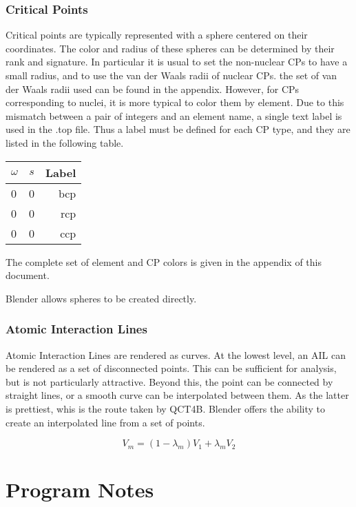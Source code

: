 \documentclass{report}
\begin{document}
\subsection{Critical Points}
Critical points are typically represented with a sphere centered on their coordinates.
The color and radius of these spheres can be determined by their rank and signature.
In particular it is usual to set the non-nuclear CPs to have a small radius, and to use the van der Waals radii of nuclear CPs.
the set of van der Waals radii used can be found in the appendix.
However, for CPs corresponding to nuclei, it is more typical to color them by element.
Due to this mismatch between a pair of integers and an element name, a single text label is used in the .top file.
Thus a label must be defined for each CP type, and they are listed in the following table.

\begin{tabular}{ l c || r }
$\omega$ & $s$ & Label \\
\hline
0 & 0 & bcp \\
0 & 0 & rcp \\
0 & 0 & ccp \\
\end{tabular}

The complete set of element and CP colors is given in the appendix of this document.

Blender allows spheres to be created directly.

\subsection{Atomic Interaction Lines}

Atomic Interaction Lines are rendered as curves.
At the lowest level, an AIL can be rendered as a set of disconnected points.
This can be sufficient for analysis, but is not particularly attractive.
Beyond this, the point can be connected by straight lines, or a smooth curve can be interpolated between them.
As the latter is prettiest, whis is the route taken by QCT4B.
Blender offers the ability to create an interpolated line from a set of points.

\begin{equation}
V_{m} = (1 - \lambda_{m}) V_{1} + \lambda_{m} V_{2}
\end{equation}

\chapter{Program Notes}
\end{document}
